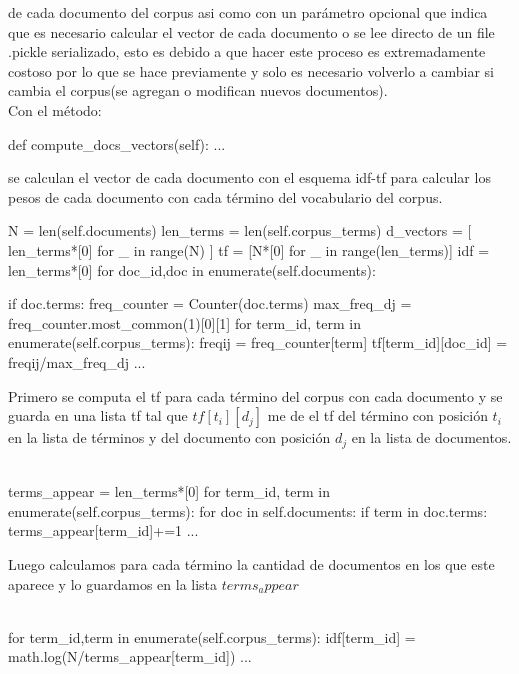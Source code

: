 \documentclass{llncs}
\begin{document}
de cada documento del corpus asi como con un parámetro opcional que indica que es necesario
calcular el vector de cada documento o se lee directo de un file .pickle serializado, 
esto es debido a que hacer este proceso es extremadamente costoso por lo que se hace previamente
y solo es necesario volverlo a cambiar si cambia el corpus(se agregan o modifican nuevos documentos).
\\
Con el método:
\begin{python}
    def compute_docs_vectors(self):
    ...
\end{python}
\noindent
se calculan el vector de cada documento con el esquema idf-tf para calcular los pesos de
cada documento con cada término del vocabulario del corpus.

\begin{python}
    N = len(self.documents)
    len_terms = len(self.corpus_terms)
    d_vectors = [ len_terms*[0] for _ in range(N) ]
    tf = [N*[0] for _ in range(len_terms)]
    idf = len_terms*[0]
    for doc_id,doc in enumerate(self.documents):

    if doc.terms: 
        freq_counter = Counter(doc.terms)
        max_freq_dj  = freq_counter.most_common(1)[0][1] 
        for term_id, term in enumerate(self.corpus_terms):
            freqij = freq_counter[term]
            tf[term_id][doc_id] = freqij/max_freq_dj 
    ...
\end{python}

\noindent
Primero se computa el tf para cada término del corpus con cada documento y se guarda 
en una lista tf tal que $tf[t_i][d_j]$ me de el tf del término con posición $t_i$ en la lista
de términos y del documento con posición $d_j$ en la lista de documentos.
\\\\
\begin{python}
    terms_appear = len_terms*[0] 
        for term_id, term in enumerate(self.corpus_terms):
            for doc in self.documents: 
                if term in doc.terms:
                    terms_appear[term_id]+=1
    ...
\end{python}

Luego calculamos para cada término la cantidad de documentos en los que este aparece y lo guardamos 
en la lista $terms_appear$
\\\\
\begin{python}
    for term_id,term in enumerate(self.corpus_terms):
        idf[term_id] =  math.log(N/terms_appear[term_id])
    ...
\end{python}
\end{document}
